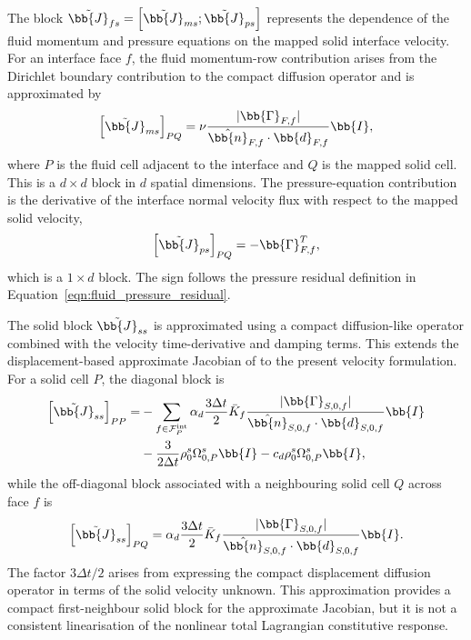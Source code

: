 The block
$\tilde{\bb{J}}_{fs}
=
\left[\tilde{\bb{J}}_{ms};\tilde{\bb{J}}_{ps}\right]$
represents the dependence of the fluid momentum and pressure equations on the
mapped solid interface velocity. For an interface face $f$, the fluid
momentum-row contribution arises from the Dirichlet boundary contribution to
the compact diffusion operator and is approximated by
\begin{equation}
    \left[\tilde{\bb{J}}_{ms}\right]_{P Q}
    =
    \nu
    \frac{|\bb{\Gamma}_{F,f}|}
         {\hat{\bb{n}}_{F,f} \cdot \bb{d}_{F,f}}
    \bb{I},
    \label{qm:eqn:fluid_solid_velocity_momentum_coupling}
\end{equation}
where $P$ is the fluid cell adjacent to the interface and $Q$ is the mapped
solid cell. This is a $d\times d$ block in $d$ spatial dimensions. The
pressure-equation contribution is the derivative of the interface normal
velocity flux with respect to the mapped solid velocity,
\begin{equation}
    \left[\tilde{\bb{J}}_{ps}\right]_{P Q}
    =
    -
    \bb{\Gamma}_{F,f}^{T},
    \label{qm:eqn:fluid_solid_velocity_pressure_coupling}
\end{equation}
which is a $1\times d$ block. The sign follows the pressure residual definition
in Equation~\eqref{eqn:fluid_pressure_residual}.

The solid block $\tilde{\bb{J}}_{ss}$ is approximated using a compact
diffusion-like operator combined with the velocity time-derivative and damping
terms. This extends the displacement-based approximate Jacobian of
\citet{Cardiff2026} to the present velocity formulation. For a solid cell $P$,
the diagonal block is
\begin{align}
    \left[\tilde{\bb{J}}_{ss}\right]_{PP}
    =
    &-
    \sum_{f \in \mathcal{F}^{\mathrm{int}}_P}
    \alpha_d
    \frac{3\Delta t}{2}
    \bar{K}_f
    \frac{|\bb{\Gamma}_{S,0,f}|}
         {\hat{\bb{n}}_{S,0,f} \cdot \bb{d}_{S,0,f}}
    \bb{I}
    \notag \\
    &-
    \frac{3}{2\Delta t}
    \rho^s_0 \Omega^s_{0,P}
    \bb{I}
    -
    c_d \rho^s_0 \Omega^s_{0,P}
    \bb{I},
    \label{qm:eqn:Jss_diag}
\end{align}
while the off-diagonal block associated with a neighbouring solid cell $Q$
across face $f$ is
\begin{equation}
    \left[\tilde{\bb{J}}_{ss}\right]_{PQ}
    =
    \alpha_d
    \frac{3\Delta t}{2}
    \bar{K}_f
    \frac{|\bb{\Gamma}_{S,0,f}|}
         {\hat{\bb{n}}_{S,0,f} \cdot \bb{d}_{S,0,f}}
    \bb{I}.
    \label{qm:eqn:Jss_offdiag}
\end{equation}
The factor $3\Delta t/2$ arises from expressing the compact displacement
diffusion operator in terms of the solid velocity unknown.
This approximation provides a compact first-neighbour solid block for the
approximate Jacobian, but it is not a consistent linearisation of the nonlinear
total Lagrangian constitutive response.

